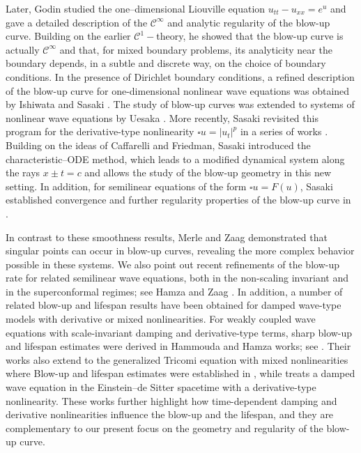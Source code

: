 \documentclass[
  sn-mathphys-num,
  colorlinks,
  linkcolor=darkmagenta,
  citecolor=rufous,
  urlcolor=zaffre,
  hypertexnames=false
]{sn-jnl}
\numberwithin{equation}{section}
\begin{document}
Later, Godin \cite{Godin2002} studied the one–dimensional Liouville equation $u_{tt}-u_{xx}=e^{u}$ and gave a detailed description of the $\mathcal{C}^\infty$ and analytic regularity of the blow-up curve. Building on the earlier $\mathcal{C}^1-$theory, he showed that the blow-up curve is actually $\mathcal{C}^\infty$ and that, for mixed boundary problems, its analyticity near the boundary depends, in a subtle and discrete way, on the choice of boundary conditions. In the presence of Dirichlet boundary conditions, a refined description of the blow-up curve for one-dimensional nonlinear wave equations was obtained by Ishiwata and Sasaki \cite{IshiwataSasakiDirichlet2020}. The study of blow-up curves was extended to systems of nonlinear wave equations by Uesaka \cite{Uesaka2009}.
 More recently, Sasaki revisited this program for the derivative-type nonlinearity
$\square u = |u_t|^{p}$  in a series of works  \cite{Sasaki2018,Sasaki2019}.
Building on the ideas of Caffarelli and Friedman, Sasaki introduced the characteristic–ODE method, which leads to a modified dynamical
system along the rays $x \pm t=c$ and allows the study of the blow-up geometry in this new setting. In addition, for semilinear equations of the form $\square u = F(u)$, Sasaki established convergence and further regularity properties of the blow-up curve in \cite{SasakiConvergence2021,SasakiRegularity2022}.

In contrast to these smoothness results, Merle and Zaag \cite{Merle2005,Merle2012} demonstrated that singular points can occur in blow-up curves, revealing the more complex behavior possible in these systems. We also point out recent refinements of the blow-up rate for related semilinear wave equations, both in the non-scaling invariant and in the superconformal regimes; see Hamza and Zaag \cite{HamzaZaagNonScaling2021,HamzaZaagSuperconformal2025}. In addition, a number of related blow-up and lifespan results have been obtained for damped wave-type models with derivative or mixed nonlinearities. 
For weakly coupled wave equations with scale-invariant damping and derivative-type terms, sharp blow-up and lifespan estimates were derived  in Hammouda and Hamza works; see \cite{MH2,MH4}. Their works also extend to the generalized Tricomi equation with mixed nonlinearities where 
Blow-up and lifespan estimates were established in \cite{MH55}, while \cite{HHP2} treats a damped wave equation in the Einstein--de Sitter spacetime with a derivative-type nonlinearity. 
These works further highlight how time-dependent damping and derivative nonlinearities influence the blow-up and the lifespan, and they are complementary to our present focus on the geometry and regularity of the blow-up curve.
\end{document}
